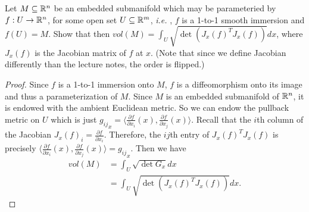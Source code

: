 \documentclass[12pt]{article}
\begin{document}
\begin{problem}[LN13 0.12]
Let $ M \subseteq \mathbb{R}^{n}$ be an embedded submanifold which may be parameteried by $ f: U \to \mathbb{R}^{n}$, for some open set $ U \subseteq \mathbb{R}^{m}$, \emph{i.e.} , $ f$ is a 1-to-1 smooth immersion and  $ f(U) =M$. Show that then  $ vol(M) = \int_U \sqrt{ \det (J_x(f)^{T} J_x(f))} dx $, where $ J_x(f)$ is the Jacobian matrix of  $ f $ at  $ x$. (Note that since we define Jacobian differently than the lecture notes, the order is flipped.)
\end{problem}
\begin{proof}
	Since $ f$ is a 1-to-1 immersion onto $ M$,  $ f$ is a diffeomorphism onto its image and thus a parameterization of  $ M$. Since $ M$ is an embedded submanifold of  $ \mathbb{R}^{n}$, it is endowed with the ambient Euclidean metric. So we can endow the pullback metric on $ U$ which is just  $ {g_{ij}}_x = \langle \frac{\partial f}{\partial x_i}(x) , \frac{\partial f}{\partial x_j}(x)  \rangle$. Recall that the $ i$th column of the Jacobian $ J_x(f)_{i} = \frac{\partial f}{\partial x_i}$. Therefore, the $ ij$th entry of  $ J_x(f)^{T} J_x(f)$ is precisely $\langle \frac{\partial f}{\partial x_i}(x) , \frac{\partial f}{\partial x_j}(x)  \rangle = {g_{ij}}_x$. Then we have
\begin{align*}
	vol(M) &= \int_U \sqrt{ \det G_x} dx \\
	&= \int_U \sqrt{ \det (J_x(f)^{T} J_x(f))} dx .
\end{align*}
\end{proof}
\end{document}
